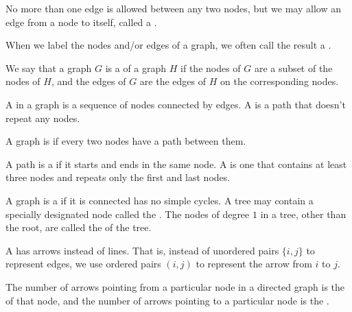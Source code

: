\documentclass[12pt, a4paper, oneside, openright, titlepage]{book}
\begin{document}
\begin{appendices}
        No more than one edge is allowed between any two nodes, but we may allow an edge from a node to itself, called a .

        When we label the nodes and/or edges of a graph, we often call the result a . 

        \begin{defn}
            We say that a graph $G$ is a  of a graph $H$ if the nodes of $G$ are a subset of the nodes of $H$, and the edges of $G$ are the edges of $H$ on the corresponding nodes.
        \end{defn}

        \begin{defn}
            A  in a graph is a sequence of nodes connected by edges. A  is a path that doesn't repeat any nodes.
        \end{defn}

        \begin{defn}
            A graph is  if every two nodes have a path between them.
        \end{defn}

        \begin{defn}
            A path is a  if it starts and ends in the same node. A  is one that contains at least three nodes and repeats only the first and last nodes.
        \end{defn}

    
        \begin{defn}
            A graph is a  if it is connected has no simple cycles. A tree may contain a specially designated node called the . The nodes of degree $1$ in a tree, other than the root, are called the  of the tree.
        \end{defn}

        \begin{defn}
            A  has arrows instead of lines. That is, instead of unordered pairs $\{i,j\}$ to represent edges, we use ordered pairs $(i,j)$ to represent the arrow from $i$ to $j$.
        \end{defn}

        \begin{defn}
            The number of arrows pointing from a particular node in a directed graph is the  of that node, and the number of arrows pointing to a particular node is the .
        \end{defn}


\end{appendices}
\end{document}
